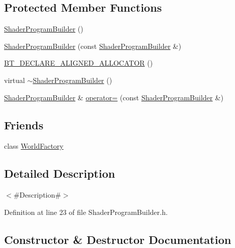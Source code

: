 \subsection*{Protected Member Functions}
\begin{DoxyCompactItemize}
\item 
\mbox{\hyperlink{classnjli_1_1_shader_program_builder_a4743299668f5602a53b707a34d160e10}{Shader\+Program\+Builder}} ()
\item 
\mbox{\hyperlink{classnjli_1_1_shader_program_builder_a8e2f894d4040fb68acb4d0af0cacafd8}{Shader\+Program\+Builder}} (const \mbox{\hyperlink{classnjli_1_1_shader_program_builder}{Shader\+Program\+Builder}} \&)
\item 
\mbox{\hyperlink{classnjli_1_1_shader_program_builder_af93458672273f1de79cf909e24e57851}{B\+T\+\_\+\+D\+E\+C\+L\+A\+R\+E\+\_\+\+A\+L\+I\+G\+N\+E\+D\+\_\+\+A\+L\+L\+O\+C\+A\+T\+OR}} ()
\item 
virtual \mbox{\hyperlink{classnjli_1_1_shader_program_builder_a4bd9e9f32cf2de9930d3436d77855fdd}{$\sim$\+Shader\+Program\+Builder}} ()
\item 
\mbox{\hyperlink{classnjli_1_1_shader_program_builder}{Shader\+Program\+Builder}} \& \mbox{\hyperlink{classnjli_1_1_shader_program_builder_a9a3271993de06e35de522429e79e616c}{operator=}} (const \mbox{\hyperlink{classnjli_1_1_shader_program_builder}{Shader\+Program\+Builder}} \&)
\end{DoxyCompactItemize}
\subsection*{Friends}
\begin{DoxyCompactItemize}
\item 
class \mbox{\hyperlink{classnjli_1_1_shader_program_builder_acb96ebb09abe8f2a37a915a842babfac}{World\+Factory}}
\end{DoxyCompactItemize}


\subsection{Detailed Description}
$<$\#\+Description\#$>$ 

Definition at line 23 of file Shader\+Program\+Builder.\+h.



\subsection{Constructor \& Destructor Documentation}
\mbox{\label{classnjli_1_1_shader_program_builder_a4743299668f5602a53b707a34d160e10}} 
